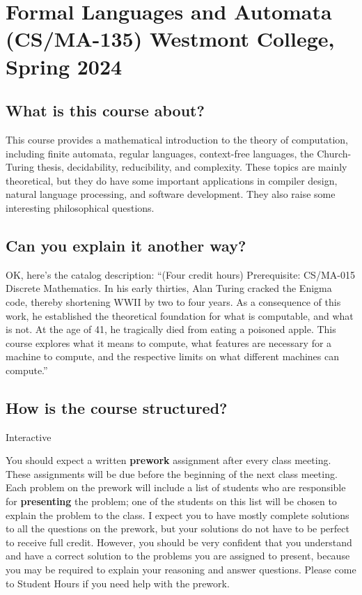 \documentclass[
  twoside]{article}
\author{}
\date{\vspace{-2.5em}}
\begin{document}
\hypertarget{formal-languages-and-automata-csma-135-westmont-college-spring-2024}{%
\section{Formal Languages and Automata (CS/MA-135) Westmont College,
Spring
2024}\label{formal-languages-and-automata-csma-135-westmont-college-spring-2024}}

\hypertarget{what-is-this-course-about}{%
\subsection{What is this course
about?}\label{what-is-this-course-about}}

This course provides a mathematical introduction to the theory of
computation, including finite automata, regular languages, context-free
languages, the Church-Turing thesis, decidability, reducibility, and
complexity. These topics are mainly theoretical, but they do have some
important applications in compiler design, natural language processing,
and software development. They also raise some interesting philosophical
questions.

\hypertarget{can-you-explain-it-another-way}{%
\subsection{Can you explain it another
way?}\label{can-you-explain-it-another-way}}

OK, here's the catalog description: ``(Four credit hours) Prerequisite:
CS/MA-015 Discrete Mathematics. In his early thirties, Alan Turing
cracked the Enigma code, thereby shortening WWII by two to four years.
As a consequence of this work, he established the theoretical foundation
for what is computable, and what is not. At the age of 41, he tragically
died from eating a poisoned apple. This course explores what it means to
compute, what features are necessary for a machine to compute, and the
respective limits on what different machines can compute.''

\hypertarget{how-is-the-course-structured}{%
\subsection{How is the course
structured?}\label{how-is-the-course-structured}}

Interactive

You should expect a written \textbf{prework} assignment after every
class meeting. These assignments will be due before the beginning of the
next class meeting. Each problem on the prework will include a list of
students who are responsible for \textbf{presenting} the problem; one of
the students on this list will be chosen to explain the problem to the
class. I expect you to have mostly complete solutions to all the
questions on the prework, but your solutions do not have to be perfect
to receive full credit. However, you should be very confident that you
understand and have a correct solution to the problems you are assigned
to present, because you may be required to explain your reasoning and
answer questions. Please come to Student Hours if you need help with the
prework.
\end{document}
